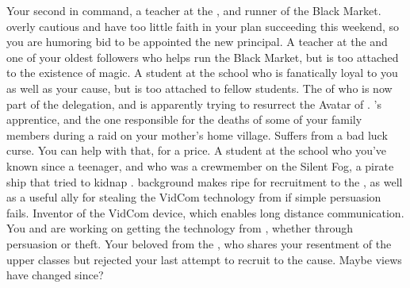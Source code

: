 \documentclass[char]{GL2020}
\begin{document}
\begin{contacts}
    \contact{\cChupSecond{}} Your second in command, a teacher at the \pSc{}, and runner of the Black Market. \cChupSecond{\They} \cChupSecond{\are} overly cautious and have too little faith in your plan succeeding this weekend, so you are humoring \cChupSecond{\their} bid to be appointed the new principal.
    \contact{\cChupInventor{}} A teacher at the \pSc{} and one of your oldest followers who helps run the Black Market, but is too attached to the existence of magic.     
    \contact{\cChupStudent{}} A student at the school who is fanatically loyal to you as well as your cause, but is too attached to \cChupStudent{\their} fellow students. 
    \contact{\cEbbPriest{}} The \cEbbPriest{\cleric} of \cEbb{} who is now part of the \pShip{} delegation, and is apparently trying to resurrect the Avatar of \cEbb{}.
    \contact{\cJuniorStatesman{}} \cHeadDiplomat{}'s apprentice, and the one responsible for the deaths of some of your \cCurse{\formal} family members during a \pShippie{} raid on your mother's home village.
    \contact{\cInitiate{}} Suffers from a bad luck curse. You can help with that, for a price.
    \contact{\cPirateChild{}} A student at the school  who you've known since \cPirateChild{\they} \cPirateChild{\were} a teenager, and who was a crewmember on the Silent Fog, a pirate ship that tried to kidnap \cHeadDiplomat{}. \cPirateChild{\Their} background makes \cPirateChild{\them} ripe for recruitment to the \pGoaties{}, as well as a useful ally for stealing the VidCom technology from \cTechStar{} if simple persuasion fails.
    \contact{\cTechStar{}} Inventor of the VidCom device, which enables long distance communication. You and \cChupInventor{} are working on getting the technology from \cTechStar{\them}, whether through persuasion or theft.
    \contact{\cCurse{}} Your beloved \cCurse{\auncle} from the \pFarm{}, who shares your resentment of the upper classes but rejected your last attempt to recruit \cCurse{\them} to the cause. Maybe \cCurse{\their} views have changed since?
\end{contacts}
\end{document}
